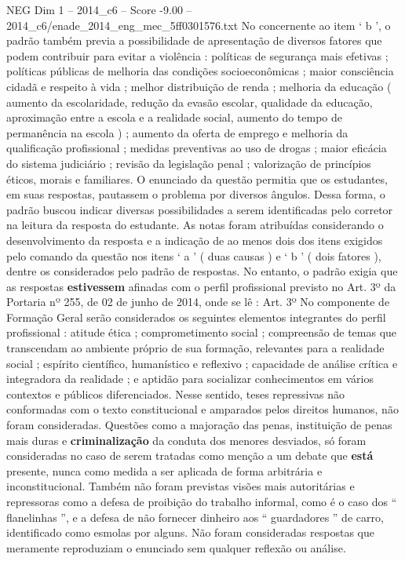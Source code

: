 \begin{textsample}{NEG Dim 1 – 2014\_c6 – Score -9.00 – 2014\_c6/enade\_2014\_eng\_mec\_5ff0301576.txt}
No concernente ao item ‘ b ’, o padrão também previa a possibilidade de apresentação de diversos fatores que podem contribuir para evitar a violência : políticas de segurança mais efetivas ; políticas públicas de melhoria das condições socioeconômicas ; maior consciência cidadã e respeito à vida ; melhor distribuição de renda ; melhoria da educação ( aumento da escolaridade, redução da evasão escolar, qualidade da educação, aproximação entre a escola e a realidade social, aumento do tempo de permanência na escola ) ; aumento da oferta de emprego e melhoria da qualificação profissional ; medidas preventivas ao uso de drogas ; maior eficácia do sistema judiciário ; revisão da legislação penal ; valorização de princípios éticos, morais e familiares.
O enunciado da questão permitia que os estudantes, em suas respostas, pautassem o problema por diversos ângulos.
Dessa forma, o padrão buscou indicar diversas possibilidades a serem identificadas pelo corretor na leitura da resposta do estudante.
As notas foram atribuídas considerando o desenvolvimento da resposta e a indicação de ao menos dois dos itens exigidos pelo comando da questão nos itens ‘ a ’ ( duas causas ) e ‘ b ’ ( dois fatores ), dentre os considerados pelo padrão de respostas.
No entanto, o padrão exigia que as respostas \textbf{estivessem} afinadas com o perfil profissional previsto no Art. 3º da Portaria nº 255, de 02 de junho de 2014, onde se lê : Art. 3º No componente de Formação Geral serão considerados os seguintes elementos integrantes do perfil profissional : atitude ética ; comprometimento social ; compreensão de temas que transcendam ao ambiente próprio de sua formação, relevantes para a realidade social ; espírito científico, humanístico e reflexivo ; capacidade de análise crítica e integradora da realidade ; e aptidão para socializar conhecimentos em vários contextos e públicos diferenciados.
Nesse sentido, teses repressivas não conformadas com o texto constitucional e amparados pelos direitos humanos, não foram consideradas.
Questões como a majoração das penas, instituição de penas mais duras e \textbf{criminalização} da conduta dos menores desviados, só foram consideradas no caso de serem tratadas como menção a um debate que \textbf{está} presente, nunca como medida a ser aplicada de forma arbitrária e inconstitucional.
Também não foram previstas visões mais autoritárias e repressoras como a defesa de proibição do trabalho informal, como é o caso dos “ flanelinhas ”, e a defesa de não fornecer dinheiro aos “ guardadores ” de carro, identificado como esmolas por alguns.
Não foram consideradas respostas que meramente reproduziam o enunciado sem qualquer reflexão ou análise.

\end{textsample}
